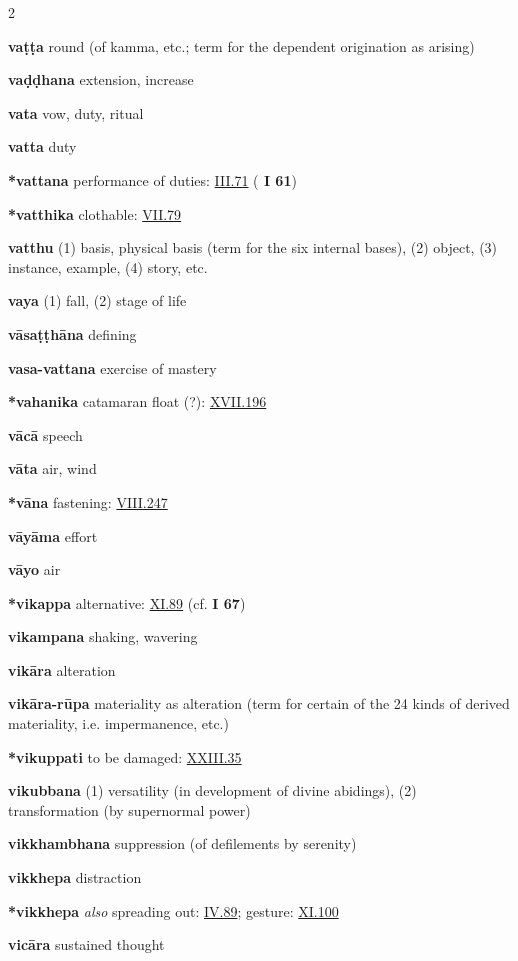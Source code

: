 \begin{multicols}{2}
\begin{vismHanging}
\par\textbf{vaṭṭa} round (of kamma, etc.; term for the dependent origination as arising) 
\par\textbf{vaḍḍhana} extension, increase
\par\textbf{vata} vow, duty, ritual
\par\textbf{vatta} duty
\par\textbf{*vattana} performance of duties: \hyperlink{III.71}{III.71}{} (\textbf{\cite{Vin} I 61}) 
\par\textbf{*vatthika} clothable: \hyperlink{VII.79}{VII.79}{}
\par\textbf{vatthu} (1) basis, physical basis (term for the six internal bases), (2) object, (3) instance, example, (4) story, etc. 
\par\textbf{vaya} (1) fall, (2) stage of life
\par\textbf{vāsaṭṭhāna} defining 
\par\textbf{vasa-vattana} exercise of mastery 
\par\textbf{*vahanika} catamaran float (?): \hyperlink{XVII.196}{XVII.196}{}
\par\textbf{vācā} speech
\par\textbf{vāta} air, wind
\par\textbf{*vāna} fastening: \hyperlink{VIII.247}{VIII.247}{}
\par\textbf{vāyāma} effort 
\par\textbf{vāyo} air 
\par\textbf{*vikappa} alternative: \hyperlink{XI.89}{XI.89}{} (cf. \textbf{\cite{M-a} I 67})
\par\textbf{vikampana} shaking, wavering
\par\textbf{vikāra} alteration
\par\textbf{vikāra-rūpa} materiality as alteration (term for certain of the 24 kinds of derived materiality, i.e. impermanence, etc.) 
\par\textbf{*vikuppati} to be damaged: \hyperlink{XXIII.35}{XXIII.35}{} 
\par\textbf{vikubbana} (1) versatility (in development of divine abidings), (2) transformation (by supernormal power) 
\par\textbf{vikkhambhana} suppression (of defilements by serenity)
\par\textbf{vikkhepa} distraction
\par\textbf{*vikkhepa} \emph{also }spreading out: \hyperlink{IV.89}{IV.89}{}; gesture: \hyperlink{XI.100}{XI.100}{} 
\par\textbf{vicāra} sustained thought

\end{vismHanging}
\end{multicols}
